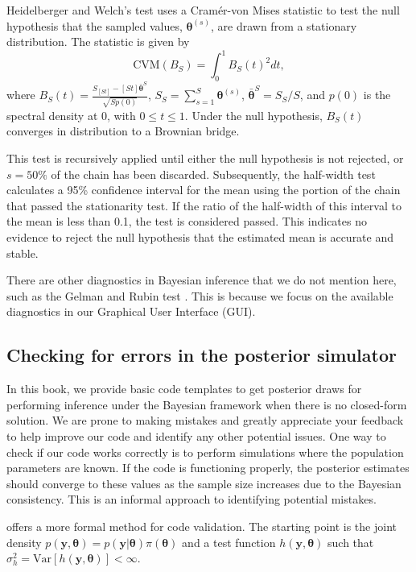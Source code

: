 Heidelberger and Welch's test \cite{Heidelberger1983} uses a Cramér-von Mises statistic to test the null hypothesis that the sampled values, $\bm{\theta}^{(s)}$, are drawn from a stationary distribution. The statistic is given by 
\[
\text{CVM}(B_S) = \int_0^1 B_S(t)^2 dt,
\]
where $B_S(t) = \frac{S_{\left[St\right]} - \left[St\right] \bar{\bm{\theta}}^S}{\sqrt{S p(0)}}$, $S_S = \sum_{s=1}^S \bm{\theta}^{(s)}$, $\bar{\bm{\theta}}^S = S_S / S$, and $p(0)$ is the spectral density at 0, with $0 \leq t \leq 1$. Under the null hypothesis, $B_S(t)$ converges in distribution to a Brownian bridge.

This test is recursively applied until either the null hypothesis is not rejected, or $s = 50\%$ of the chain has been discarded. Subsequently, the half-width test calculates a 95\% confidence interval for the mean using the portion of the chain that passed the stationarity test. If the ratio of the half-width of this interval to the mean is less than 0.1, the test is considered passed. This indicates no evidence to reject the null hypothesis that the estimated mean is accurate and stable.

There are other diagnostics in Bayesian inference that we do not mention here, such as the Gelman and Rubin test \cite{Gelman1992}. This is because we focus on the available diagnostics in our Graphical User Interface (GUI).

\subsection{Checking for errors in the posterior simulator}

In this book, we provide basic code templates to get posterior draws for performing inference under the Bayesian framework when there is no closed-form solution. We are prone to making mistakes and greatly appreciate your feedback to help improve our code and identify any other potential issues. One way to check if our code works correctly is to perform simulations where the population parameters are known. If the code is functioning properly, the posterior estimates should converge to these values as the sample size increases due to the Bayesian consistency. This is an informal approach to identifying potential mistakes.

\cite{geweke2004getting} offers a more formal method for code validation. The starting point is the joint density $p(\bm{y},\bm{\theta})=p(\bm{y}|\bm{\theta})\pi(\bm{\theta})$ and a test function $h(\bm{y},\bm{\theta})$ such that $\sigma_h^2=\text{Var}[h(\bm{y},\bm{\theta})]<\infty$.


